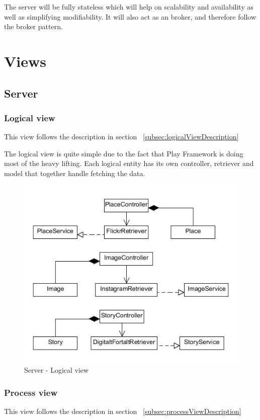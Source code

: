 \documentclass[11pt]{book}
\begin{document}
The server will be fully stateless which will help on scalability and availability as well as simplifying modifiability. It will also act as an broker, and therefore follow the broker pattern.

\section{Views}

\subsection{Server}

\subsubsection{Logical view}
This view follows the description in section ~\ref{subsec:logicalViewDescription}

The logical view is quite simple due to the fact that Play Framework is doing most of the heavy lifting. Each logical entity has its own controller, retriever and model that together handle fetching the data.

\begin{figure}[H]
      \centering
      \includegraphics[width=1.0\textwidth]{Figures/Architecture/serverLogical.jpg}
      \caption{Server - Logical view}
      \label{fig:arch_server_logical}
\end{figure}

\subsubsection{Process view}
This view follows the description in section ~\ref{subsec:processViewDescription}
\end{document}
